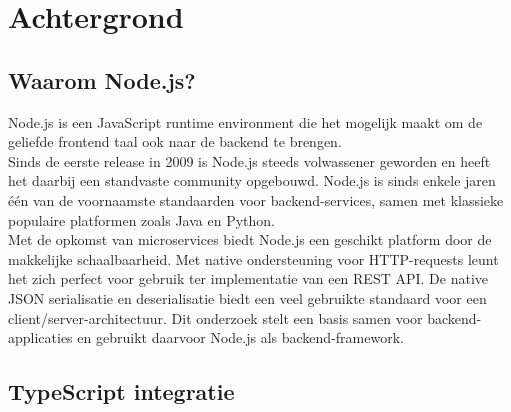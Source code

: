 
\section{Achtergrond}
\label{sec:achtergrond}


\subsection{Waarom Node.js?}

Node.js is een JavaScript runtime environment die het mogelijk maakt om de geliefde frontend taal ook naar de backend te brengen. \\
Sinds de eerste release in 2009 is Node.js steeds volwassener geworden en heeft het daarbij een standvaste community opgebouwd. Node.js is sinds enkele jaren één van de voornaamste standaarden voor backend-services, samen met klassieke populaire platformen zoals Java en Python.  \\
Met de opkomst van microservices biedt Node.js een geschikt platform door de makkelijke schaalbaarheid. Met native ondersteuning voor HTTP-requests leunt het zich perfect voor gebruik ter implementatie van een REST API. De native JSON serialisatie en deserialisatie biedt een veel gebruikte standaard voor een client/server-architectuur.
Dit onderzoek stelt een basis samen voor backend-applicaties en gebruikt daarvoor Node.js als backend-framework.

\subsection{TypeScript integratie}

